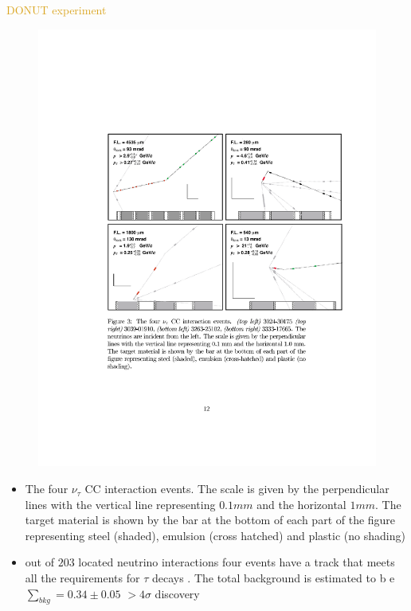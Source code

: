 \documentclass[11pt]{beamer} %
\renewcommand{\(}{\begin{columns}}
\renewcommand{\)}{\end{columns}}
\newcommand{\<}[1]{\begin{column}{#1}}
\renewcommand{\>}{\end{column}}
\newcommand{\itt}{\begin{itemize}}
\newcommand{\tti}{\end{itemize}}
\newcommand{\backupend}
           {
             \addtocounter{framenumbervorappendix}{-\value{framenumber}}
             \addtocounter{framenumber}{\value{framenumbervorappendix}} 
           }
\begin{document}
\begin{frame}{\textcolor{Goldenrod}{DONUT experiment}}
  \begin{overlayarea}{\textwidth}{\textheight}
    \begin{figure}[h]
      \centering
      \includegraphics[height=0.4\textheight]{./Images/DONUT03}
    \end{figure}
    
    \itt[<only@+>]
  \item The four $\nu_{\tau}$ CC interaction events. The scale is
given by the perpendicular lines with the vertical line representing
$0.1mm$ and the horizontal $1mm$. {\small The target material is shown
by the bar at the bottom of each part of the figure representing steel
(shaded), emulsion (cross hatched) and plastic (no shading)}
  \item out of $203$ located neutrino interactions four events have a
track that meets all the requirements for $\tau$ decays . The total
background is estimated to b e $\sum_{bkg} = 0.34 \pm 0.05$ \to $> 4
\sigma $ \to discovery
    
    \tti
  \end{overlayarea}
\end{frame}





\backupend
\end{document}
